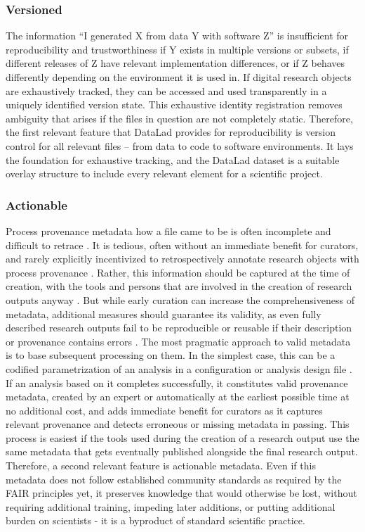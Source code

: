 \subsubsection{Versioned}

The information ``I generated X from data Y with software Z'' is insufficient for reproducibility and trustworthiness if Y exists in multiple versions or subsets, if different releases of Z have relevant implementation differences, or if Z behaves differently depending on the environment it is used in.
If digital research objects are exhaustively tracked, they can be accessed and used transparently in a uniquely identified version state.
This exhaustive identity registration removes ambiguity that arises if the files in question are not completely static.
Therefore, the first relevant feature that DataLad provides for reproducibility is version control for all relevant files -- from data to code to software environments.
It lays the foundation for exhaustive tracking, and the DataLad dataset is a suitable overlay structure to include every relevant element for a scientific project.

\subsubsection{Actionable}

Process provenance metadata how a file came to be is often incomplete and difficult to retrace \citep{hardwicke2018data}.
It is tedious, often without an immediate benefit for curators, and rarely explicitly incentivized to retrospectively annotate research objects with process provenance \citep{edwards2011science, san2009long}.
Rather, this information should be captured at the time of creation, with the tools and persons that are involved in the creation of research outputs anyway \citep{dallas2016digital}.
But while early curation can increase the comprehensiveness of metadata, additional measures should guarantee its validity, as even fully described research outputs fail to be reproducible or reusable if their description or provenance contains errors \citep[see, e.g.,][]{manninen2017reproducibility}.
The most pragmatic approach to valid metadata is to base subsequent processing on them.
In the simplest case, this can be a codified parametrization of an analysis in a configuration or analysis design file  \citep[see, e.g.,][]{jas2018reproducible}.
If an analysis based on it completes successfully, it constitutes valid provenance metadata, created by an expert or automatically at the earliest possible time at no additional cost, and adds immediate benefit for curators as it captures relevant provenance and detects erroneous or missing metadata in passing.
This process is easiest if the tools used during the creation of a research output use the same metadata that gets eventually published alongside the final research output.
Therefore, a second relevant feature is actionable metadata.
Even if this metadata does not follow established community standards as required by the \gls{FAIR} principles yet, it preserves knowledge that would otherwise be lost, without requiring additional training, impeding later additions, or putting additional burden on scientists - it is a byproduct of standard scientific practice.


